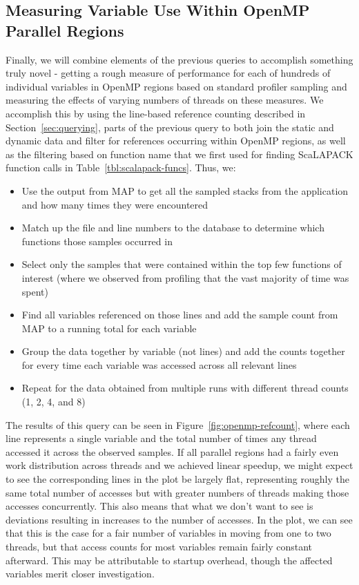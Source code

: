 \subsection{Measuring Variable Use Within OpenMP Parallel Regions}

Finally, we will combine elements of the previous queries to accomplish something truly novel - 
getting a rough measure of performance for each of hundreds of individual variables in OpenMP 
regions based on standard profiler sampling and measuring the effects of varying numbers of 
threads on these measures.
We accomplish this by using the line-based reference counting described in 
Section~\ref{sec:querying}, parts of the previous query to both join the static and dynamic data and 
filter for references occurring within OpenMP regions, as well as the filtering based on function name 
that we first used for finding ScaLAPACK function calls in Table~\ref{tbl:scalapack-funcs}.
Thus, we:
\begin{itemize}
\item Use the output from MAP to get all the sampled stacks from the application and how many 
times they were encountered
\item Match up the file and line numbers to the database to determine which functions those samples 
occurred in
\item Select only the samples that were contained within the top few functions of interest (where we 
observed from profiling that the vast majority of time was spent)
\item Find all variables referenced on those lines and add the sample count from MAP to a running 
total for each variable
\item Group the data together by variable (not lines) and add the counts together for every time each 
variable was accessed across all relevant lines
\item Repeat for the data obtained from multiple runs with different thread counts (1, 2, 4, and 8)
\end{itemize}
The results of this query can be seen in Figure~\ref{fig:openmp-refcount}, where each line 
represents a single variable and the total number of times any thread accessed it across the 
observed samples.
If all parallel regions had a fairly even work distribution across threads and we achieved linear 
speedup, we might expect to see the corresponding lines in the plot be largely flat, representing 
roughly the same total number of accesses but with greater numbers of threads making those 
accesses concurrently.
This also means that what we don't want to see is deviations resulting in increases to the number of 
accesses.
In the plot, we can see that this is the case for a fair number of variables in moving from one to two 
threads, but that access counts for most variables remain fairly constant afterward.
This may be attributable to startup overhead, though the affected variables merit closer investigation.

